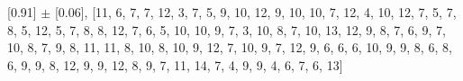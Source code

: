 [0.91] $\pm$ [0.06], [11, 6, 7, 7, 12, 3, 7, 5, 9, 10, 12, 9, 10, 10, 7, 12, 4, 10, 12, 7, 5, 7, 8, 5, 12, 5, 7, 8, 8, 12, 7, 6, 5, 10, 10, 9, 7, 3, 10, 8, 7, 10, 13, 12, 9, 8, 7, 6, 9, 7, 10, 8, 7, 9, 8, 11, 11, 8, 10, 8, 10, 9, 12, 7, 10, 9, 7, 12, 9, 6, 6, 6, 10, 9, 9, 8, 6, 8, 6, 9, 9, 8, 12, 9, 9, 12, 8, 9, 7, 11, 14, 7, 4, 9, 9, 4, 6, 7, 6, 13]